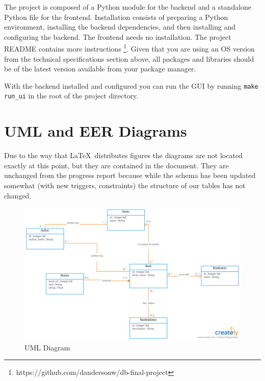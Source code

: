 \documentclass{article}
\begin{document}
The project is composed of a Python module for the backend
and a standalone Python file for the frontend.
Installation consists of preparing a Python environment,
installing the backend dependencies,
and then installing and configuring the backend.
The frontend needs no installation.
The project README contains more instructions
\footnote{https://github.com/dandersonw/db-final-project}.
Given that you are using an OS version from the
technical specifications section above,
all packages and libraries should be of the latest version available
from your package manager.

\noindent
With the backend installed and configured you can run the GUI
by running \texttt{make run\_ui} in the root of the project directory.

\section*{UML and EER Diagrams}

Due to the way that \LaTeX \ distributes figures
the diagrams are not located exactly at this point,
but they are contained in the document.
They are unchanged from the progress report
because while the schema has been updated somewhat
(with new triggers, constraints)
the structure of our tables has not changed.

\begin{figure}[h]
  \centering
  \includegraphics[width=\textwidth]{uml}
  \caption{UML Diagram}
\end{figure}
\end{document}
